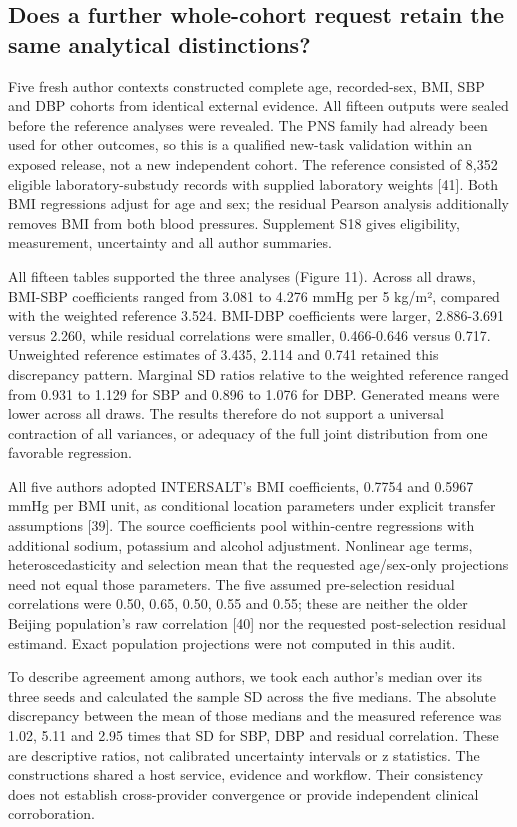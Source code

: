 \documentclass[11pt,letterpaper]{article}
\begin{document}
\subsection{Does a further whole-cohort request retain the same analytical distinctions?}

Five fresh author contexts constructed complete age, recorded-sex, BMI, SBP and DBP cohorts from identical external evidence. All fifteen outputs were sealed before the reference analyses were revealed. The PNS family had already been used for other outcomes, so this is a qualified new-task validation within an exposed release, not a new independent cohort. The reference consisted of 8,352 eligible laboratory-substudy records with supplied laboratory weights [41]. Both BMI regressions adjust for age and sex; the residual Pearson analysis additionally removes BMI from both blood pressures. Supplement S18 gives eligibility, measurement, uncertainty and all author summaries.


All fifteen tables supported the three analyses (Figure 11). Across all draws, BMI-SBP coefficients ranged from 3.081 to 4.276 mmHg per 5 kg/\allowbreak{}m², compared with the weighted reference 3.524. BMI-DBP coefficients were larger, 2.886-3.691 versus 2.260, while residual correlations were smaller, 0.466-0.646 versus 0.717. Unweighted reference estimates of 3.435, 2.114 and 0.741 retained this discrepancy pattern. Marginal SD ratios relative to the weighted reference ranged from 0.931 to 1.129 for SBP and 0.896 to 1.076 for DBP. Generated means were lower across all draws. The results therefore do not support a universal contraction of all variances, or adequacy of the full joint distribution from one favorable regression.


All five authors adopted INTERSALT's BMI coefficients, 0.7754 and 0.5967 mmHg per BMI unit, as conditional location parameters under explicit transfer assumptions [39]. The source coefficients pool within-centre regressions with additional sodium, potassium and alcohol adjustment. Nonlinear age terms, heteroscedasticity and selection mean that the requested age/\allowbreak{}sex-only projections need not equal those parameters. The five assumed pre-selection residual correlations were 0.50, 0.65, 0.50, 0.55 and 0.55; these are neither the older Beijing population's raw correlation [40] nor the requested post-selection residual estimand. Exact population projections were not computed in this audit.


To describe agreement among authors, we took each author's median over its three seeds and calculated the sample SD across the five medians. The absolute discrepancy between the mean of those medians and the measured reference was 1.02, 5.11 and 2.95 times that SD for SBP, DBP and residual correlation. These are descriptive ratios, not calibrated uncertainty intervals or z statistics. The constructions shared a host service, evidence and workflow. Their consistency does not establish cross-provider convergence or provide independent clinical corroboration.
\end{document}
